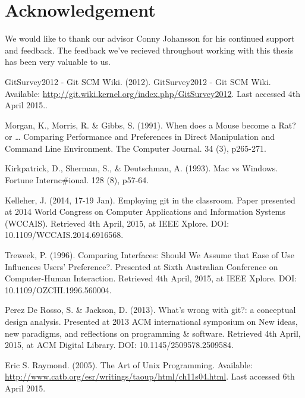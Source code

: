 \documentclass[a4paper,oneside]{bth} %
\begin{document}
		\chapter*{Acknowledgement}
		We would like to thank our advisor Conny Johansson for his continued support and feedback. The feedback we've recieved throughout working with this thesis has been very valuable to us.
		
		\newpage
		\begin{thebibliography}{1}
			
			GitSurvey2012 - Git SCM Wiki. (2012). GitSurvey2012 - Git SCM Wiki. Available: \url{http://git.wiki.kernel.org/index.php/GitSurvey2012}. Last accessed 4th April 2015..
			
			Morgan, K., Morris, R. \& Gibbs, S. (1991). When does a Mouse become a Rat? or … Comparing Performance and Preferences in Direct Manipulation and Command Line Environment. The Computer Journal. 34 (3), p265-271.
			
			Kirkpatrick, D., Sherman, S., \& Deutschman, A. (1993). Mac vs Windows. Fortune Internc\#ional. 128 (8), p57-64.
			
			Kelleher, J. (2014, 17-19 Jan). Employing git in the classroom. Paper presented at 2014 World Congress on Computer Applications and Information Systems (WCCAIS). Retrieved 4th April, 2015, at IEEE Xplore. DOI: 10.1109/WCCAIS.2014.6916568.
			
			Treweek, P. (1996). Comparing Interfaces: Should We Assume that Ease of Use Influences Users' Preference?. Presented at Sixth Australian Conference on Computer-Human Interaction. Retrieved 4th April, 2015, at IEEE Xplore. DOI: 10.1109/OZCHI.1996.560004.
			
			
			Perez De Rosso, S. \& Jackson, D. (2013). What's wrong with git?: a conceptual design analysis. Presented at 2013 ACM international symposium on New ideas, new paradigms, and reflections on programming \& software. Retrieved 4th April, 2015, at ACM Digital Library. DOI: 10.1145/2509578.2509584.
			
			Eric S. Raymond. (2005). The Art of Unix Programming.
			Available: \url{http://www.catb.org/esr/writings/taoup/html/ch11s04.html}.
			Last accessed 6th April 2015.
			

\end{thebibliography}
\end{document}
